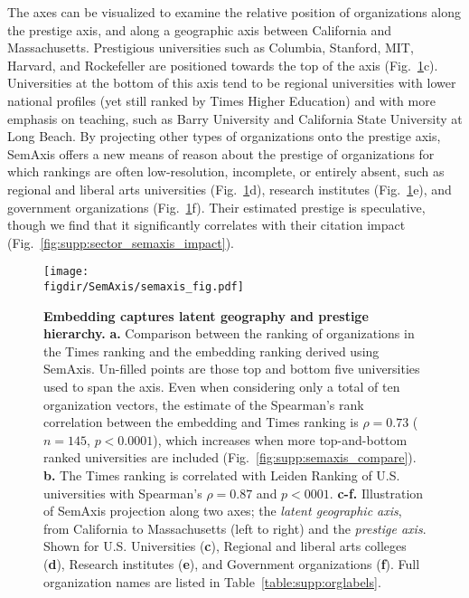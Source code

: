 \documentclass[12pt]{article} %
\def\figdir{../Figs}
\begin{document}
The axes can be visualized to examine the relative position of organizations along the prestige axis, and along a geographic axis between California and Massachusetts.
Prestigious universities such as Columbia, Stanford, MIT, Harvard, and Rockefeller are positioned towards the top of the axis (Fig.~\ref{fig:semaxis}c).
Universities at the bottom of this axis tend to be regional universities with lower national profiles (yet still ranked by Times Higher Education) and with more emphasis on teaching, such as Barry University and California State University at Long Beach.
By projecting other types of organizations onto the prestige axis, SemAxis offers a new means of reason about the prestige of organizations for which rankings are often low-resolution, incomplete, or entirely absent, such as regional and liberal arts universities (Fig.~\ref{fig:semaxis}d), research institutes (Fig.~\ref{fig:semaxis}e), and government organizations (Fig.~\ref{fig:semaxis}f).
Their estimated prestige is speculative, though we find that it significantly correlates with their citation impact (Fig.~\ref{fig:supp:sector_semaxis_impact}).


%
%
\begin{figure}[hp!]
	\centering
	\texttt{[image: \\figdir/SemAxis/semaxis\_fig.pdf]}
	\caption{
		\textbf{Embedding captures latent geography and prestige hierarchy.}
		\textbf{a.} Comparison between the ranking of organizations in the Times ranking and the embedding ranking derived using SemAxis.
		Un-filled points are those top and bottom five universities used to span the axis.
		Even when considering only a total of ten organization vectors, the estimate of the Spearman's rank correlation between the embedding and Times ranking is $\rho = 0.73$ ($n = 145$, $p < 0.0001$), which increases when more top-and-bottom ranked universities are included (Fig.~\ref{fig:supp:semaxis_compare}).
		\textbf{b.} The Times ranking is correlated with Leiden Ranking of U.S. universities with Spearman's $\rho = 0.87$ and $p < 0001$.
		\textbf{c-f.} Illustration of SemAxis projection along two axes;  the \textit{latent geographic axis}, from California to Massachusetts (left to right) and the \textit{prestige axis}.
		Shown for U.S. Universities (\textbf{c}), Regional and liberal arts colleges (\textbf{d}), Research institutes (\textbf{e}), and Government organizations (\textbf{f}).
		Full organization names are listed in Table~\ref{table:supp:orglabels}.
	}
	\label{fig:semaxis}
\end{figure}
\end{document}
